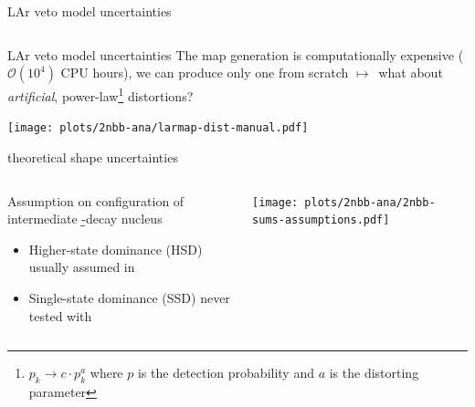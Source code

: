 \documentclass[10pt,aspectratio=169]{beamer}
\newcommand{\arrow}{$\longmapsto$}
\begin{document}
\begin{frame}{LAr veto model uncertainties}
\begin{columns}
\begin{column}{0.15\textwidth}
\begin{center}
      \end{center}
    \end{column}
  \end{columns}
\end{frame}
\begin{frame}{LAr veto model uncertainties}
  The map generation is computationally expensive ($\mathcal{O}{(10^4)}$ CPU
  hours), we can produce only one from scratch \arrow\ what about
  \emph{artificial}, power-law\footnote{$p_k \rightarrow c \cdot p_k^a$ where
  $p$ is the detection probability and $a$ is the distorting parameter}
  distortions?
  \begin{center}
    \texttt{[image: plots/2nbb-ana/larmap-dist-manual.pdf]}
  \end{center}
\end{frame}
\begin{frame}{\texorpdfstring{\nnbb}{2νββ} theoretical shape uncertainties}
  \begin{columns}
    \begin{column}{0.5\textwidth}
      Assumption on configuration of intermediate \b\b-decay nucleus
      \begin{itemize}
        \item Higher-state dominance (HSD) usually assumed in \gesix
        \item Single-state dominance (SSD) never tested with \gesix
      \end{itemize}
    \end{column}
    \begin{column}{0.5\textwidth}
      \begin{center}
        \texttt{[image: plots/2nbb-ana/2nbb-sums-assumptions.pdf]}
      \end{center}
    \end{column}
  \end{columns}
\end{frame}
\end{document}
